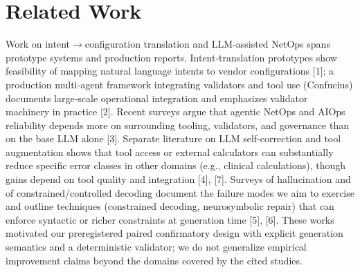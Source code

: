 \documentclass[conference]{IEEEtran}
\begin{document}
\section{Related Work}
Work on intent\ensuremath{\rightarrow}configuration translation and LLM‑assisted NetOps spans prototype systems and production reports. Intent‑translation prototypes show feasibility of mapping natural language intents to vendor configurations [1]; a production multi‑agent framework integrating validators and tool use (Confucius) documents large‑scale operational integration and emphasizes validator machinery in practice [2]. Recent surveys argue that agentic NetOps and AIOps reliability depends more on surrounding tooling, validators, and governance than on the base LLM alone [3]. Separate literature on LLM self‑correction and tool augmentation shows that tool access or external calculators can substantially reduce specific error classes in other domains (e.g., clinical calculations), though gains depend on tool quality and integration [4], [7]. Surveys of hallucination and of constrained/controlled decoding document the failure modes we aim to exercise and outline techniques (constrained decoding, neurosymbolic repair) that can enforce syntactic or richer constraints at generation time [5], [6]. These works motivated our preregistered paired confirmatory design with explicit generation semantics and a deterministic validator; we do not generalize empirical improvement claims beyond the domains covered by the cited studies.
\end{document}
